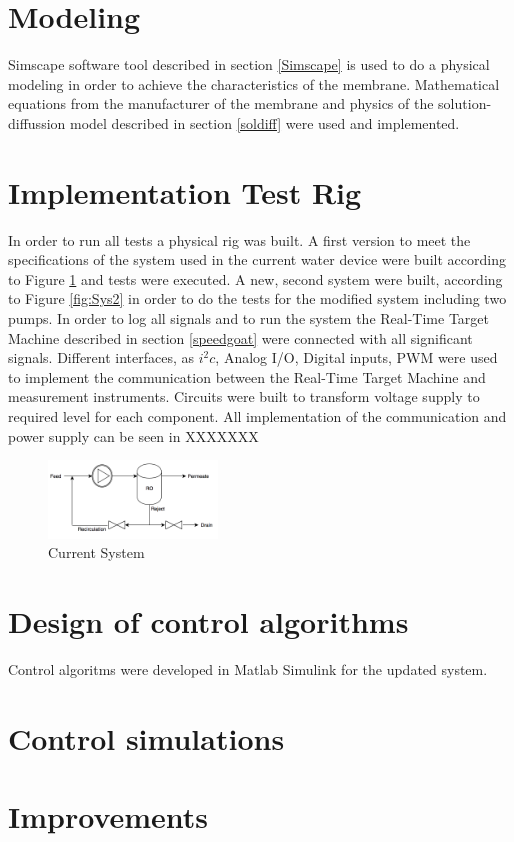 \section{Modeling}
Simscape software tool described in section \ref{Simscape} is used to do a physical modeling in order to achieve the characteristics of the membrane. Mathematical equations from the manufacturer of the membrane and physics of the solution-diffussion model described in section \ref{soldiff} were used and implemented.

\section{Implementation Test Rig}
In order to run all tests a physical rig was built. A first version to meet the specifications of the system used in the current water device were built according to Figure \ref{fig:Sys1} and tests were executed.
A new, second system were built, according to Figure \ref{fig:Sys2} in order to do the tests for the modified system including two pumps. In order to log all signals and to run the system the Real-Time Target Machine described in section \ref{speedgoat} were connected with all significant signals.
Different interfaces, as $i^{2}c$, Analog I/O, Digital inputs, PWM were used to implement the communication between the Real-Time Target Machine and measurement instruments. Circuits were built to transform voltage supply to required level for each component. All implementation of the communication and power supply can be seen in XXXXXXX

\begin{figure}[h]
    \centering
    \includegraphics[width=0.4\textwidth]{Sys1}
    \caption{Current System}
    \label{fig:Sys1}
\end{figure}


\section{Design of control algorithms}
Control algoritms were developed in Matlab Simulink for the updated system. 

\section{Control simulations}



\section{Improvements}

